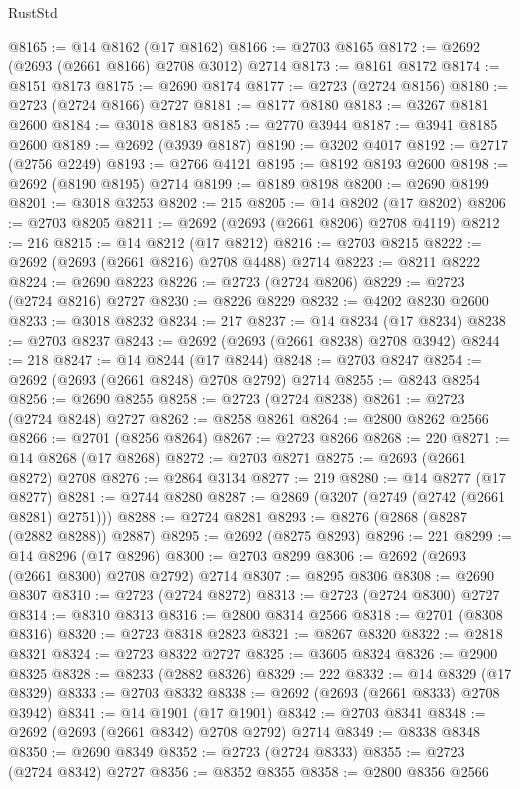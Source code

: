 \begin{lexlean}{RustStd}
\begin{coremodule}
{\begin{coremodule}
{{{{{{{{{{{{{{{{{{{{{{{{{{{{{{{{{{{{{{{@8165 := @14 @8162 (@17 @8162)
@8166 := @2703 @8165
@8172 := @2692 (@2693 (@2661 @8166) @2708 @3012) @2714
@8173 := @8161 @8172
@8174 := @8151 @8173
@8175 := @2690 @8174
@8177 := @2723 (@2724 @8156)
@8180 := @2723 (@2724 @8166) @2727
@8181 := @8177 @8180
@8183 := @3267 @8181 @2600
@8184 := @3018 @8183
@8185 := @2770 @3944
@8187 := @3941 @8185 @2600
@8189 := @2692 (@3939 @8187)
@8190 := @3202 @4017
@8192 := @2717 (@2756 @2249)
@8193 := @2766 @4121
@8195 := @8192 @8193 @2600
@8198 := @2692 (@8190 @8195) @2714
@8199 := @8189 @8198
@8200 := @2690 @8199
@8201 := @3018 @3253
@8202 := 215
@8205 := @14 @8202 (@17 @8202)
@8206 := @2703 @8205
@8211 := @2692 (@2693 (@2661 @8206) @2708 @4119)
@8212 := 216
@8215 := @14 @8212 (@17 @8212)
@8216 := @2703 @8215
@8222 := @2692 (@2693 (@2661 @8216) @2708 @4488) @2714
@8223 := @8211 @8222
@8224 := @2690 @8223
@8226 := @2723 (@2724 @8206)
@8229 := @2723 (@2724 @8216) @2727
@8230 := @8226 @8229
@8232 := @4202 @8230 @2600
@8233 := @3018 @8232
@8234 := 217
@8237 := @14 @8234 (@17 @8234)
@8238 := @2703 @8237
@8243 := @2692 (@2693 (@2661 @8238) @2708 @3942)
@8244 := 218
@8247 := @14 @8244 (@17 @8244)
@8248 := @2703 @8247
@8254 := @2692 (@2693 (@2661 @8248) @2708 @2792) @2714
@8255 := @8243 @8254
@8256 := @2690 @8255
@8258 := @2723 (@2724 @8238)
@8261 := @2723 (@2724 @8248) @2727
@8262 := @8258 @8261
@8264 := @2800 @8262 @2566
@8266 := @2701 (@8256 @8264)
@8267 := @2723 @8266
@8268 := 220
@8271 := @14 @8268 (@17 @8268)
@8272 := @2703 @8271
@8275 := @2693 (@2661 @8272) @2708
@8276 := @2864 @3134
@8277 := 219
@8280 := @14 @8277 (@17 @8277)
@8281 := @2744 @8280
@8287 := @2869 (@3207 (@2749 (@2742 (@2661 @8281) @2751)))
@8288 := @2724 @8281
@8293 := @8276 (@2868 (@8287 (@2882 @8288)) @2887)
@8295 := @2692 (@8275 @8293)
@8296 := 221
@8299 := @14 @8296 (@17 @8296)
@8300 := @2703 @8299
@8306 := @2692 (@2693 (@2661 @8300) @2708 @2792) @2714
@8307 := @8295 @8306
@8308 := @2690 @8307
@8310 := @2723 (@2724 @8272)
@8313 := @2723 (@2724 @8300) @2727
@8314 := @8310 @8313
@8316 := @2800 @8314 @2566
@8318 := @2701 (@8308 @8316)
@8320 := @2723 @8318 @2823
@8321 := @8267 @8320
@8322 := @2818 @8321
@8324 := @2723 @8322 @2727
@8325 := @3605 @8324
@8326 := @2900 @8325
@8328 := @8233 (@2882 @8326)
@8329 := 222
@8332 := @14 @8329 (@17 @8329)
@8333 := @2703 @8332
@8338 := @2692 (@2693 (@2661 @8333) @2708 @3942)
@8341 := @14 @1901 (@17 @1901)
@8342 := @2703 @8341
@8348 := @2692 (@2693 (@2661 @8342) @2708 @2792) @2714
@8349 := @8338 @8348
@8350 := @2690 @8349
@8352 := @2723 (@2724 @8333)
@8355 := @2723 (@2724 @8342) @2727
@8356 := @8352 @8355
@8358 := @2800 @8356 @2566
}}}}}}}}}}}}}}}}}}}}}}}}}}}}}}}}}}}}}}}
\end{coremodule}}
\end{coremodule}
\end{lexlean}
